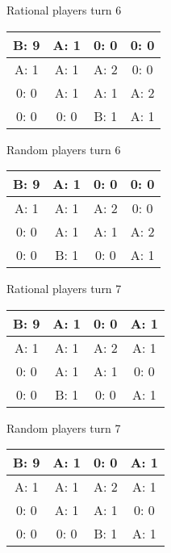 \documentclass[12pt]{article}
\begin{document}
Rational players turn 6
\begin{center}
\begin{tabular}{|c|c|c|c|} 
\hline
B: 9  & A: 1  & 0: 0  & 0: 0  \\ \hline
A: 1  & A: 1  & A: 2  & 0: 0  \\ \hline
0: 0  & A: 1  & A: 1  & A: 2  \\ \hline
0: 0  & 0: 0  & B: 1  & A: 1  \\ \hline
\end{tabular} 
\end{center}
Random players turn 6
\begin{center}
\begin{tabular}{|c|c|c|c|} 
\hline
B: 9  & A: 1  & 0: 0  & 0: 0  \\ \hline
A: 1  & A: 1  & A: 2  & 0: 0  \\ \hline
0: 0  & A: 1  & A: 1  & A: 2  \\ \hline
0: 0  & B: 1  & 0: 0  & A: 1  \\ \hline
\end{tabular} 
\end{center}

Rational players turn 7
\begin{center}
\begin{tabular}{|c|c|c|c|} 
\hline
B: 9  & A: 1  & 0: 0  & A: 1  \\ \hline
A: 1  & A: 1  & A: 2  & A: 1  \\ \hline
0: 0  & A: 1  & A: 1  & 0: 0  \\ \hline
0: 0  & B: 1  & 0: 0  & A: 1  \\ \hline
\end{tabular} 
\end{center}
Random players turn 7
\begin{center}
\begin{tabular}{|c|c|c|c|} 
\hline
B: 9  & A: 1  & 0: 0  & A: 1  \\ \hline
A: 1  & A: 1  & A: 2  & A: 1  \\ \hline
0: 0  & A: 1  & A: 1  & 0: 0  \\ \hline
0: 0  & 0: 0  & B: 1  & A: 1  \\ \hline
\end{tabular} 
\end{center}
\end{document}

